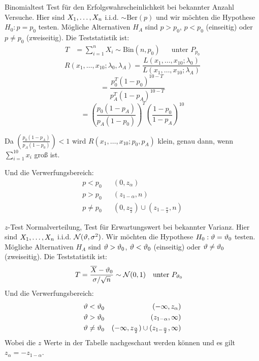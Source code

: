 \begin{definition}{Binomialtest}
  \color{red}Test für den Erfolgswahrscheinlichkeit bei bekannter Anzahl Versuche. \color{black} Hier sind
  $X_1, \dots, X_n$ i.i.d. $\sim \text{Ber}(p)$ und wir möchten die
  Hypothese $H_0 : p = p_0$ testen. Mögliche Alternativen $H_A$ sind $p > p_0$, $p < p_0$ (einseitig) oder $p \neq p_0$ (zweiseitig). Die Teststatistik ist:
  \begin{align*}
    T & = \sum_{i=1}^{n} X_i \sim \text{Bin}(n, p_0) &  & \text{unter } P_{p_0}
  \end{align*}
  \[
    R(x_1, \ldots, x_{10}; \lambda_0, \lambda_A) = \frac{L(x_1, \ldots, x_{10}; \lambda_0)}{L(x_1, \ldots, x_{10}; \lambda_A)}
  \]
  \[
    = \frac{p_0^T (1 - p_0)^{10-T}}{p_A^T (1 - p_A)^{10-T}}
  \]
  \[
    = \left( \frac{p_0(1 - p_A)}{p_A(1 - p_0)} \right)^T \left( \frac{1 - p_0}{1 - p_A} \right)^{10}
  \]

  Da $\left( \frac{p_0(1-p_A)}{p_A(1-p_0)} \right) < 1$ wird $R(x_1, \ldots, x_{10}; p_0, p_A)$ klein, genau dann, wenn $\sum_{i=1}^{10} x_i$ groß ist.

  Und die Verwerfungsbereich:
  \begin{align*}
    p < p_0    &  & (0, z_\alpha)                                                 \\
    p > p_0    &  & (z_{1 - \alpha}, n)                                           \\
    p \neq p_0 &  & (0, z_{\frac{\alpha}{2}}) \cup  (z_{1 - \frac{\alpha}{2}}, n)
  \end{align*}



\end{definition}
\begin{definition}{$z$-Test}
  \color{red}Normalverteilung, Test für Erwartungswert bei bekannter Varianz. \color{black} Hier sind
  $X_1, \dots, X_n$ i.i.d. $\mathcal{N} (\vartheta, \sigma^2)$. Wir möchten die
  Hypothese $H_0 : \vartheta = \vartheta_0$ testen. Mögliche Alternativen $H_A$ sind $\vartheta >
    \vartheta_0$, $\vartheta < \vartheta_0$ (einseitig) oder $\vartheta \neq \vartheta_0$ (zweiseitig). Die
  Teststatistik ist:
  \begin{align*}
    T & = \frac{\overline{X} - \vartheta_0}{\sigma / \sqrt{n}} \sim \mathcal{N} (0, 1)
      &                                                                               & \text{unter } P_{\vartheta_0}
  \end{align*}
  Und die Verwerfungsbereich:
  \begin{align*}
    \vartheta < \vartheta_0    &  & (-\infty, z_\alpha)                                                      \\
    \vartheta > \vartheta_0    &  & (z_{1 - \alpha}, \infty)                                                 \\
    \vartheta \neq \vartheta_0 &  & (-\infty, z_{\frac{\alpha}{2}}) \cup  (z_{1 - \frac{\alpha}{2}}, \infty)
  \end{align*}
  Wobei die $z$ Werte in der Tabelle nachgeschaut werden können
  und es gilt $z_\alpha = - z_{1 - \alpha}$.
\end{definition}
\BoxStart{}
